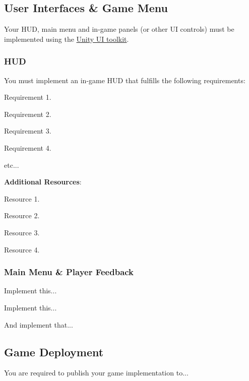 \documentclass[11pt, a4paper]{article}
\begin{document}
    \subsection{User Interfaces \& Game Menu}
    \label{sec:hudui}
    \noindent Your HUD, main menu and in-game panels (or other UI controls) must be implemented using the \href{https://docs.unity3d.com/Packages/com.unity.ugui@1.0/manual/index.html}{Unity UI toolkit}.
    \subsubsection{HUD}
    \label{sec:hudD}
    \noindent You must implement an in-game HUD that fulfills the following requirements:
    \begin{borderedsquare}
        \item Requirement 1.
        \item Requirement 2.
        \item Requirement 3.
        \item Requirement 4.
        \item etc...
    \end{borderedsquare}

\noindent {\color{rltblue}\large\bfseries\faBook} \space \textbf{Additional Resources}:

\begin{filledRightArrowList}
    \item Resource 1. 
    \item Resource 2. 
    \item Resource 3. 
    \item Resource 4. 
\end{filledRightArrowList}
    
    \subsubsection{Main Menu \& Player Feedback}
    \label{sec:mainmenu}
    \begin{filledstarlist}
        \item Implement this... 
        \item Implement this... 
        \item And implement that...         
    \end{filledstarlist}
    
    \subsection{Game Deployment}
    \label{sec:publish}
    You are required to publish your game implementation to...  
    
\end{document}
